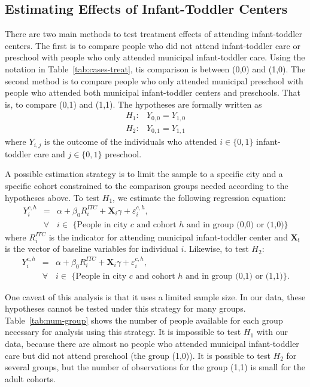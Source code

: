 \subsection{Estimating Effects of Infant-Toddler Centers}
There are two main methods to test treatment effects of attending infant-toddler centers. The first is to compare people who did not attend infant-toddler care or preschool with people who only attended municipal infant-toddler care. Using the notation in Table~\ref{tab:cases-treat}, tis comparison is between (0,0) and (1,0). The second method is to compare people who only attended municipal preschool with people who attended both municipal infant-toddler centers and preschools. That is, to compare (0,1) and (1,1). The hypotheses are formally written as
\begin{eqnarray}
H_1: &  Y_{0,0} = Y_{1,0} \\ 
H_2: &  Y_{0,1} = Y_{1,1} 
\end{eqnarray}
\noindent where $Y_{i,j}$ is the outcome of the individuals who attended $i \in \{0,1\}$ infant-toddler care and $j \in \{0,1\}$ preschool.

A possible estimation strategy is to limit the sample to a specific city and a specific cohort constrained to the comparison groups needed according to the hypotheses above. To test $H_1$, we estimate the following regression equation:
\begin{eqnarray}
Y_{i}^{c,h} & = & \alpha + \beta_{0}R_i^{ITC} + \mathbf{X}_i\gamma + \varepsilon_{i}^{c,h}, \\ \nonumber
& \forall & i \in \text{ \{People in city $c$ and cohort $h$ and in group (0,0) or (1,0)\}}
\end{eqnarray}
where $R_i^{ITC}$ is the indicator for attending municipal infant-toddler center and $\mathbf{X_i}$ is the vector of baseline variables for individual $i$. Likewise, to test $H_2$:
\begin{eqnarray}
Y_{i}^{c,h} & = & \alpha + \beta_{0}R_i^{ITC} + \mathbf{X}_i\gamma + \varepsilon_{i}^{c,h}, \\ \nonumber
& \forall & i \in \text{ \{People in city $c$ and cohort $h$ and in group (0,1) or (1,1)\}.}
\end{eqnarray}

One caveat of this analysis is that it uses a limited sample size. In our data, these hypotheses cannot be tested under this strategy for many groups. Table~\ref{tab:num-group} shows the number of people available for each group necessary for analysis using this strategy. It is impossible to test $H_1$ with our data, because there are almost no people who attended municipal infant-toddler care but did not attend preschool (the group (1,0)). It is possible to test $H_2$ for several groups, but the number of observations for the group (1,1) is small for the adult cohorts. 

